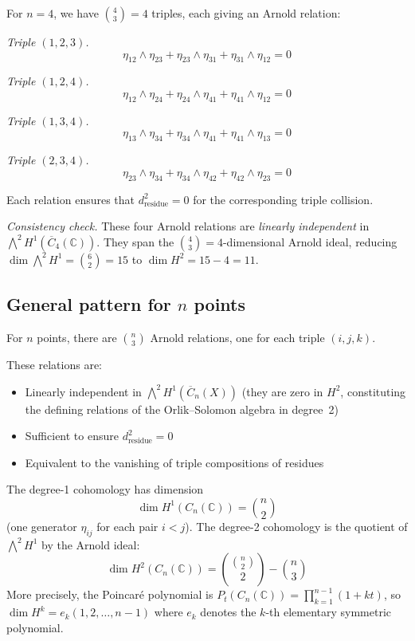 \begin{computation}\label{comp:arnold-n4}
For $n=4$, we have $\binom{4}{3} = 4$ triples, each giving an Arnold relation:

\emph{Triple $(1,2,3)$.}
\[\eta_{12} \wedge \eta_{23} + \eta_{23} \wedge \eta_{31} + \eta_{31} \wedge \eta_{12} = 0\]

\emph{Triple $(1,2,4)$.}
\[\eta_{12} \wedge \eta_{24} + \eta_{24} \wedge \eta_{41} + \eta_{41} \wedge \eta_{12} = 0\]

\emph{Triple $(1,3,4)$.}
\[\eta_{13} \wedge \eta_{34} + \eta_{34} \wedge \eta_{41} + \eta_{41} \wedge \eta_{13} = 0\]

\emph{Triple $(2,3,4)$.}
\[\eta_{23} \wedge \eta_{34} + \eta_{34} \wedge \eta_{42} + \eta_{42} \wedge \eta_{23} = 0\]

Each relation ensures that $d_{\text{residue}}^2 = 0$ for the corresponding triple collision.

\emph{Consistency check.} These four Arnold relations are \emph{linearly independent}
in $\bigwedge^2 H^1(\overline{C}_4(\mathbb{C}))$. They span the $\binom{4}{3} = 4$-dimensional
Arnold ideal, reducing $\dim \bigwedge^2 H^1 = \binom{6}{2} = 15$ to $\dim H^2 = 15 - 4 = 11$.
\end{computation}

\subsection{\texorpdfstring{General pattern for $n$ points}{General pattern for n points}}

\begin{theorem}\label{thm:arnold-general-n}
For $n$ points, there are $\binom{n}{3}$ Arnold relations, one for each triple $(i,j,k)$.

These relations are:
\begin{itemize}
\item Linearly independent in $\bigwedge^2 H^1(\overline{C}_n(X))$ (they are zero in $H^2$, constituting the defining relations of the Orlik--Solomon algebra in degree~2)
\item Sufficient to ensure $d_{\text{residue}}^2 = 0$
\item Equivalent to the vanishing of triple compositions of residues
\end{itemize}

The degree-1 cohomology has dimension
\[\dim H^1(C_n(\mathbb{C})) = \binom{n}{2}\]
(one generator $\eta_{ij}$ for each pair $i < j$).
The degree-2 cohomology is the quotient of $\bigwedge^2 H^1$ by the Arnold ideal:
\[\dim H^2(C_n(\mathbb{C})) = \binom{\binom{n}{2}}{2} - \binom{n}{3}\]
More precisely, the Poincar\'e polynomial is $P_t(C_n(\mathbb{C})) = \prod_{k=1}^{n-1}(1+kt)$,
so $\dim H^k = e_k(1, 2, \ldots, n-1)$ where $e_k$ denotes the $k$-th elementary symmetric polynomial.
\end{theorem}

